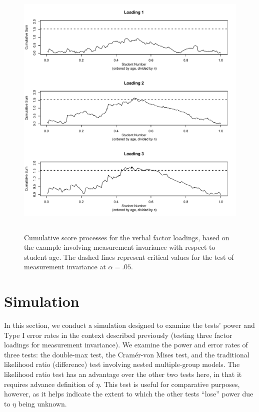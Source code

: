\documentclass[man]{apa}
\begin{document}
\begin{figure}
\caption{Cumulative score processes for the verbal factor loadings,
  based on the example involving measurement invariance with respect
  to student age.  The dashed lines represent critical values for the
  test of measurement invariance at $\alpha=.05$.}
\label{fig:cusumex}
\includegraphics[height=5in]{example.pdf}
\end{figure}

\section{Simulation}
In this section, we conduct a simulation designed to
examine the tests' power and Type I error rates in the context
described previously (testing three factor loadings for measurement
invariance).  We 
examine the power and error rates of three tests: the double-max test, the
Cram\'{e}r-von Mises test, and the traditional likelihood
ratio (difference) test involving nested 
multiple-group models.  The likelihood ratio test has an advantage over the
other two tests here, in that it requires advance definition of
$\eta$.  This test is useful for comparative purposes,
however, as it helps indicate the extent to which the other tests
``lose'' power due to $\eta$ being unknown.
\end{document}
